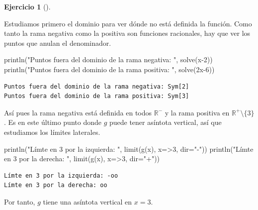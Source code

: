 \documentclass[
  a4paper,
]{scrreport}
\newenvironment{Shaded}{\begin{snugshade}}{\end{snugshade}}
\newcommand{\FloatTok}[1]{\textcolor[rgb]{0.68,0.00,0.00}{#1}}
\newcommand{\FunctionTok}[1]{\textcolor[rgb]{0.28,0.35,0.67}{#1}}
\newcommand{\NormalTok}[1]{\textcolor[rgb]{0.00,0.23,0.31}{#1}}
\newcommand{\OperatorTok}[1]{\textcolor[rgb]{0.37,0.37,0.37}{#1}}
\newcommand{\SpecialCharTok}[1]{\textcolor[rgb]{0.37,0.37,0.37}{#1}}
\newcommand{\StringTok}[1]{\textcolor[rgb]{0.13,0.47,0.30}{#1}}
\theoremstyle{definition}
\newtheorem{exercise}{Ejercicio}[chapter]
\theoremstyle{remark}
\begin{document}
\begin{exercise}[]
\begin{enumerate}
\begin{tcolorbox}
  Estudiamos primero el dominio para ver dónde no está definida la
  función. Como tanto la rama negativa como la positiva son funciones
  racionales, hay que ver los puntos que anulan el denominador.

\begin{Shaded}
\begin{Highlighting}[]
\FunctionTok{println}\NormalTok{(}\StringTok{"Puntos fuera del dominio de la rama negativa: "}\NormalTok{, }\FunctionTok{solve}\NormalTok{(x}\OperatorTok{{-}}\FloatTok{2}\NormalTok{))}
\FunctionTok{println}\NormalTok{(}\StringTok{"Puntos fuera del dominio de la rama positiva: "}\NormalTok{, }\FunctionTok{solve}\NormalTok{(}\FloatTok{2}\NormalTok{x}\OperatorTok{{-}}\FloatTok{6}\NormalTok{))}
\end{Highlighting}
\end{Shaded}

\begin{verbatim}
Puntos fuera del dominio de la rama negativa: Sym[2]
Puntos fuera del dominio de la rama positiva: Sym[3]
\end{verbatim}

  Así pues la rama negativa está definida en todos \(\mathbb{R}^-\) y la
  rama positiva en \(\mathbb{R}^+\setminus\{3\}\). Es en este último
  punto donde \(g\) puede tener asíntota vertical, así que estudiamos
  los límites laterales.

\begin{Shaded}
\begin{Highlighting}[]
\FunctionTok{println}\NormalTok{(}\StringTok{"Límte en 3 por la izquierda: "}\NormalTok{, }\FunctionTok{limit}\NormalTok{(}\FunctionTok{g}\NormalTok{(x), x}\OperatorTok{=\textgreater{}}\FloatTok{3}\NormalTok{, dir}\OperatorTok{=}\StringTok{"{-}"}\NormalTok{))}
\FunctionTok{println}\NormalTok{(}\StringTok{"Límte en 3 por la derecha: "}\NormalTok{, }\FunctionTok{limit}\NormalTok{(}\FunctionTok{g}\NormalTok{(x), x}\OperatorTok{=\textgreater{}}\FloatTok{3}\NormalTok{, dir}\OperatorTok{=}\StringTok{"+"}\NormalTok{))}
\end{Highlighting}
\end{Shaded}

\begin{verbatim}
Límte en 3 por la izquierda: -oo
Límte en 3 por la derecha: oo
\end{verbatim}

  Por tanto, \(g\) tiene una asíntota vertical en \(x=3\).

\begin{Shaded}
\end{Shaded}


\end{tcolorbox}
\end{enumerate}
\end{exercise}
\end{document}
